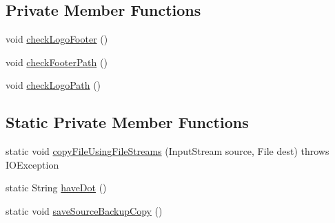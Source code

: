 \subsection*{Private Member Functions}
\begin{DoxyCompactItemize}
\item 
void \hyperlink{classit_1_1isislab_1_1masonassisteddocumentation_1_1mason_1_1analizer_1_1_global_utility_ae0228c980431c4886cc35015ecedb219}{check\-Logo\-Footer} ()
\item 
void \hyperlink{classit_1_1isislab_1_1masonassisteddocumentation_1_1mason_1_1analizer_1_1_global_utility_a461e0b0204d6c69a4126947190ca85ef}{check\-Footer\-Path} ()
\item 
void \hyperlink{classit_1_1isislab_1_1masonassisteddocumentation_1_1mason_1_1analizer_1_1_global_utility_a66a1a8d4779245f596a65fd8d95362b2}{check\-Logo\-Path} ()
\end{DoxyCompactItemize}
\subsection*{Static Private Member Functions}
\begin{DoxyCompactItemize}
\item 
static void \hyperlink{classit_1_1isislab_1_1masonassisteddocumentation_1_1mason_1_1analizer_1_1_global_utility_adb83aee7a7166b3826c7f3cf4ada53a9}{copy\-File\-Using\-File\-Streams} (Input\-Stream source, File dest)  throws I\-O\-Exception 
\item 
static String \hyperlink{classit_1_1isislab_1_1masonassisteddocumentation_1_1mason_1_1analizer_1_1_global_utility_a396066731dbc923fe85d28988511ba46}{have\-Dot} ()
\item 
static void \hyperlink{classit_1_1isislab_1_1masonassisteddocumentation_1_1mason_1_1analizer_1_1_global_utility_ad66b212a55587ad049d2034a26c0080b}{save\-Source\-Backup\-Copy} ()
\end{DoxyCompactItemize}

